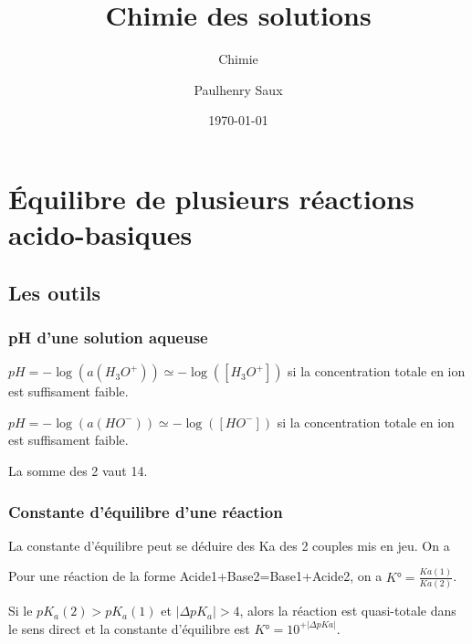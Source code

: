 \documentclass[french]{yLectureNote}
\title{Chimie des solutions}
\subtitle{Chimie}
\author{Paulhenry Saux}
\date{\today}
\begin{document}
\setcounter{chapter}{4}
\chapter{Équilibre de plusieurs réactions acido-basiques }
\section{Les outils}
\subsection{pH d'une solution aqueuse}
\begin{definition}[Définition du pH]
\(pH = -\log(a(H_3O^+)) \simeq -\log([H_3O^+])\) si la concentration totale en ion est suffisament faible.
\end{definition}
\begin{definition}
\(pH = -\log(a(HO^-)) \simeq -\log([HO^-])\) si la concentration totale en ion est suffisament faible.
\end{definition}
La somme des 2 vaut 14.
\subsection{Constante d'équilibre d'une réaction}
La constante d'équilibre peut se déduire des Ka des 2 couples mis en jeu. On a
\begin{theorem}
 Pour une réaction de la forme Acide1+Base2=Base1+Acide2, on a \(K° = \frac{Ka(1)}{Ka(2)}\).
\end{theorem}
Si le \(pK_a(2)>pK_a(1)\) et \(|\Delta pK_a| >4\), alors la réaction est quasi-totale dans le sens direct et la constante d'équilibre est \(K°=10^{+|\Delta pKa|}\).
\end{document}
